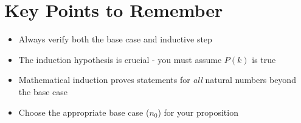 \documentclass{article}
\begin{document}
\section{Key Points to Remember}
\begin{itemize}
    \item Always verify both the base case and inductive step
    \item The induction hypothesis is crucial - you must assume $P(k)$ is true
    \item Mathematical induction proves statements for \textit{all} natural numbers beyond the base case
    \item Choose the appropriate base case ($n_0$) for your proposition
\end{itemize}
\end{document}
